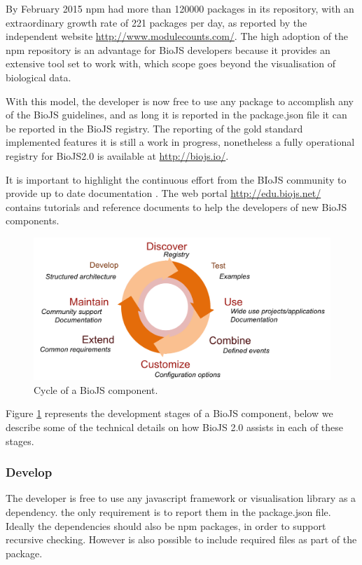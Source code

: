 By February 2015 npm had more than 120000 packages in its repository, with an extraordinary growth rate of 221 packages per day, as reported by the independent website \url{http://www.modulecounts.com/}. The high adoption of the npm repository is an advantage for BioJS developers because it provides an extensive tool set to work with, which scope goes beyond the visualisation of biological data.

With this model, the developer is now free to use any package to accomplish any of the BioJS guidelines, and as long it is reported in the package.json file it can be reported in the BioJS registry. The reporting of the gold standard implemented features it is still a work in progress, nonetheless a fully operational registry for BioJS2.0 is available at \url{http://biojs.io/}.

It is important to highlight the continuous effort from the BIoJS community to provide up to date documentation . The web portal \url{http://edu.biojs.net/} contains tutorials and reference documents to help the developers of new BioJS components.

\begin{figure}  
\centering
\includegraphics[width=\textwidth]{figures/biojs_cycle.png}
\caption[Cycle of a BioJS component]{Cycle of a BioJS component.
\label{fig:biojs_cycle}}
\end{figure}

Figure \ref{fig:biojs_cycle} represents the development stages of  a BioJS component, below we describe some of the technical details on how BioJS 2.0 assists in each of these stages.

\subsubsection{Develop}
The developer is free to use any javascript framework or visualisation library as a dependency. the only requirement is to report them in the package.json file. Ideally the dependencies should also be npm packages, in order to support recursive checking. However is also possible to include required files as part of the package. 


